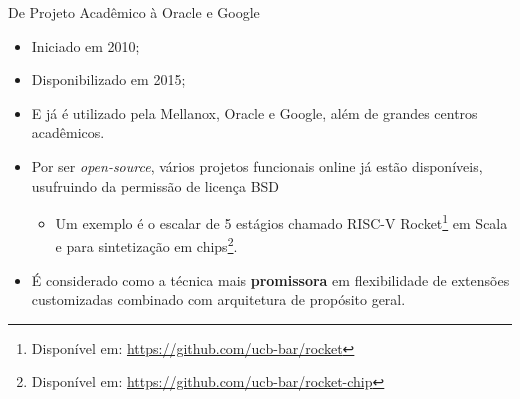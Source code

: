 \documentclass[red, aspectratio=169, xcolor=dvipsnames]{beamer}
\let\olditem=\item%
\renewcommand{\item}{\olditem \justifying}
\begin{document}
\begin{frame}{De Projeto Acadêmico à Oracle e Google}
	\begin{itemize}
		\setlength{\itemsep}{1.5em}
		\item Iniciado em 2010;
		
		\item Disponibilizado em 2015;
		
		\item E já é utilizado pela Mellanox, Oracle e Google, além de grandes centros acadêmicos.
		
		\item Por ser \textit{open-source}, vários projetos funcionais online já estão disponíveis, usufruindo da permissão de licença BSD
		\begin{itemize}
			\item Um exemplo é o escalar de 5 estágios chamado RISC-V Rocket\footnote{Disponível em: \url{https://github.com/ucb-bar/rocket}} em Scala e para sintetização em chips\footnote{Disponível em: \url{https://github.com/ucb-bar/rocket-chip}}.
		\end{itemize}
	
		\item É considerado como a técnica mais \textbf{promissora} em flexibilidade de extensões customizadas combinado com arquitetura de propósito geral.
	\end{itemize}
\end{frame}
\end{document}
